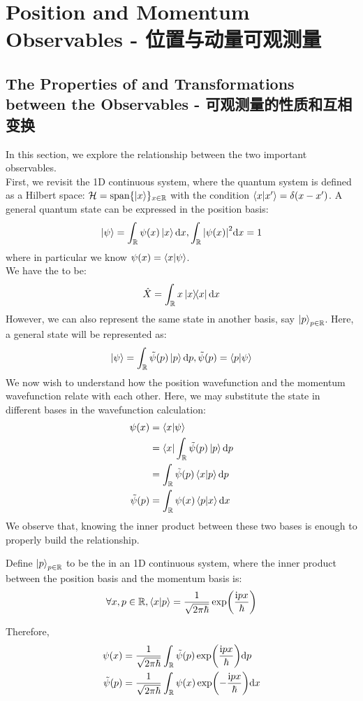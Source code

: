 \section{Position and Momentum Observables - 位置与动量可观测量}
\subsection{The Properties of and Transformations between the Observables - 可观测量的性质和互相变换}
In this section, we explore the relationship between the two important observables. \\
First, we revisit the 1D continuous system, where the quantum system is defined as a Hilbert space: $\mathcal{H} = \text{span}\{\ket{x}\}_{x \in \mathbb{R}}$ with the condition $\braket{x}{x'} = \delta(x-x')$. A general quantum state can be expressed in the position basis:
$$\ket{\psi} = \int_{\mathbb{R}} \psi(x)\ket{x} \dd x, \int_{\mathbb{R}} \abs{\psi(x)}^2 \dd x = 1$$
where in particular we know $\psi(x) = \braket{x}{\psi}$. \\
We have the  to be:
$$\oppos = \intR x \dyad{x} \dd x$$
However, we can also represent the same state in another basis, say $\ket{p}_{p \in \mathbb{R}}$. Here, a general state will be represented as:
$$\ket{\psi} = \int_{\mathbb{R}} \tilde{\psi}(p) \ket{p} \dd p, \tilde{\psi}(p) = \braket{p}{\psi}$$
We now wish to understand how the position wavefunction and the momentum wavefunction relate with each other. Here, we may substitute the state in different bases in the wavefunction calculation:
\begin{align*}
    \psi(x) &= \braket{x}{\psi} \\
    &= \bra{x} \int_{\mathbb{R}} \tilde{\psi}(p) \ket{p} \dd p \\
    &= \int_{\mathbb{R}} \tilde{\psi}(p) \braket{x}{p} \dd p \\
    \tilde{\psi}(p) &= \int_{\mathbb{R}} \psi(x) \braket{p}{x} \dd x
\end{align*}
We observe that, knowing the inner product between these two bases is enough to properly build the relationship.
\begin{definition}
    Define $\ket{p}_{p \in \mathbb{R}}$ to be the  in an 1D continuous system, where the inner product between the position basis and the momentum basis is:
    $$\forall x, p \in \mathbb{R}, \braket{x}{p} = \frac{1}{\sqrt{2\pi\hbar}}\exp(\frac{\mathrm{i} p x}{\hbar})$$
\end{definition}
Therefore,
\begin{align*}
    \psi(x) &= \frac{1}{\sqrt{2\pi\hbar}} \int_{\mathbb{R}} \tilde{\psi}(p) \exp(\frac{\mathrm{i} p x}{\hbar}) \dd p \\
    \tilde{\psi}(p) &= \frac{1}{\sqrt{2\pi\hbar}} \int_{\mathbb{R}} \psi(x) \exp(-\frac{\mathrm{i} p x}{\hbar}) \dd x
\end{align*}
